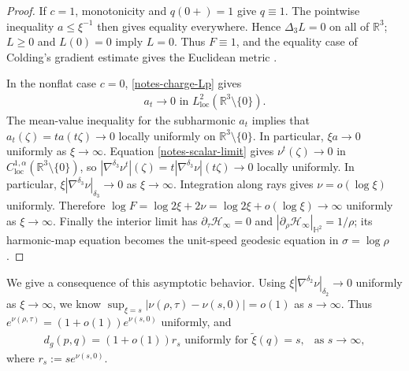 \documentclass[letterpaper]{amsart}
\theoremstyle{definition}
\theoremstyle{remark}
\begin{document}
\begin{proof}
If $c=1$, monotonicity and $q(0+)=1$ give $q\equiv1$. The pointwise inequality
$a\le\xi^{-1}$ then gives equality everywhere. Hence $\Delta_3L=0$ on all
of $\mathbb R^3$; $L\ge0$ and $L(0)=0$ imply $L=0$. Thus
$F \equiv 1$, and the equality case of Colding's
gradient estimate gives the Euclidean metric
\cite[Theorem~3.1]{notes-Colding}.

In the nonflat case $c=0$, \eqref{notes-charge-Lp} gives
\begin{align*}
	a_t \to 0 \text{ in } L^{2}_{\mathrm{loc}}(\mathbb{R}^3 \setminus \{0\} ).
\end{align*} 
The mean-value inequality for the subharmonic
$a_t$ implies that $a_t(\zeta ) = t a(t \zeta ) \to 0$ locally uniformly on $\mathbb{R}^3\setminus \{0\} $. In particular, $\xi a \to 0$ uniformly as $\xi \to \infty$.  Equation
\eqref{notes-scalar-limit} gives $ \nu ^{t}(\zeta ) \to 0 $ in $C^{1,\alpha }_{\mathrm{loc}}(\mathbb{R}^3 \setminus \{0\} )$, so $|\nabla ^{\delta _3} \nu ^{t}|(\zeta ) = t|\nabla ^{\delta _3} \nu |(t \zeta ) \to 0$ locally uniformly. In particular, $\xi|\nabla^{\delta_3}\nu|_{\delta_3}\to0$ as $\xi \to \infty$.
Integration along rays gives $\nu=o(\log\xi)$ uniformly. Therefore
$\log F= \log 2 \xi + 2 \nu =\log 2\xi+o(\log\xi) \to \infty$ uniformly as $\xi \to\infty$. Finally the interior limit
has $\partial _{\tau }\mathcal{H}_{\infty}=0$ and $|\partial _{\rho } \mathcal{H}_{\infty}|_{\mathbb H^2}=1/\rho$;
its harmonic-map equation becomes the unit-speed geodesic equation in
$\sigma=\log\rho$.
\end{proof}

We give a consequence of this asymptotic behavior. Using $\xi |\nabla ^{\delta _2} \nu |_{\delta _2} \to 0$ uniformly as $\xi \to \infty$, we know $\sup_{\xi=s}|\nu(\rho,\tau)-\nu(s,0)|=o(1)$ as $s\to\infty$. Thus $e ^{\nu (\rho , \tau )} = (1+ o(1) ) e ^{\nu (s,0)}$ uniformly, and
\begin{align*}
	d_g(p, q) = (1+ o(1) ) r_s \text{ uniformly for } \tilde{\xi }(q) = s, \ \ \text{ as } s\to \infty,
\end{align*} 
where $r_s := s e ^{\nu (s, 0)}$.
\end{document}
